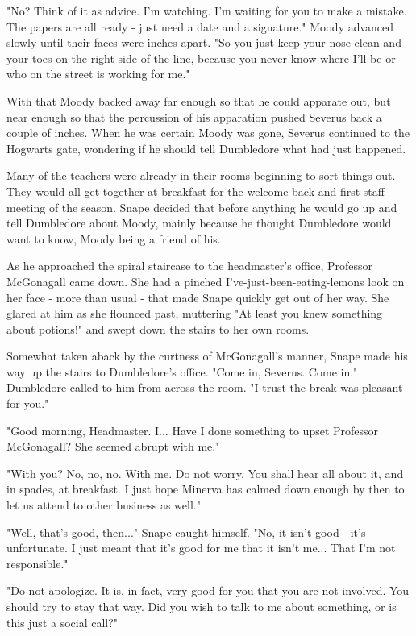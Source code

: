"No? Think of it as advice. I'm watching. I'm waiting for you to make a mistake. The papers are all ready - just need a date and a signature." Moody advanced slowly until their faces were inches apart. "So you just keep your nose clean and your toes on the right side of the line, because you never know where I'll be or who on the street is working for me."

With that Moody backed away far enough so that he could apparate out, but near enough so that the percussion of his apparation pushed Severus back a couple of inches. When he was certain Moody was gone, Severus continued to the Hogwarts gate, wondering if he should tell Dumbledore what had just happened.

Many of the teachers were already in their rooms beginning to sort things out. They would all get together at breakfast for the welcome back and first staff meeting of the season. Snape decided that before anything he would go up and tell Dumbledore about Moody, mainly because he thought Dumbledore would want to know, Moody being a friend of his.

As he approached the spiral staircase to the headmaster's office, Professor McGonagall came down. She had a pinched I've-just-been-eating-lemons look on her face - more than usual - that made Snape quickly get out of her way. She glared at him as she flounced past, muttering "At least you knew something about potions!" and swept down the stairs to her own rooms.

Somewhat taken aback by the curtness of McGonagall's manner, Snape made his way up the stairs to Dumbledore's office. "Come in, Severus. Come in." Dumbledore called to him from across the room. "I trust the break was pleasant for you."

"Good morning, Headmaster. I... Have I done something to upset Professor McGonagall? She seemed abrupt with me."

"With you? No, no, no. With me. Do not worry. You shall hear all about it, and in spades, at breakfast. I just hope Minerva has calmed down enough by then to let us attend to other business as well."

"Well, that's good, then..." Snape caught himself. "No, it isn't good - it's unfortunate. I just meant that it's good for me that it isn't me... That I'm not responsible."

"Do not apologize. It is, in fact, very good for you that you are not involved. You should try to stay that way. Did you wish to talk to me about something, or is this just a social call?"

